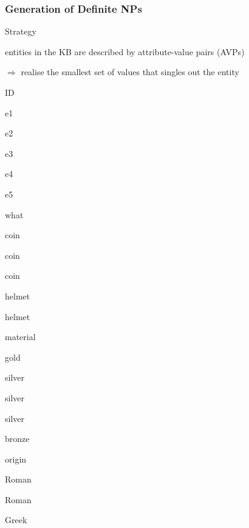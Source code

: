 \documentclass[compress,color=usenames]{beamer}
\begin{document}
\begin{frame}
\frametitle{
Generation of Deﬁnite NPs}



Strategy



entities in the KB are described by attribute-value pairs (AVPs)



$\Rightarrow$ realise the smallest set of values that singles out the entity



ID



e1



e2



e3



e4



e5






what



coin



coin



coin



helmet



helmet






material



gold



silver



silver



silver



bronze






origin



Roman



Roman



Greek




\end{frame}
\end{document}
